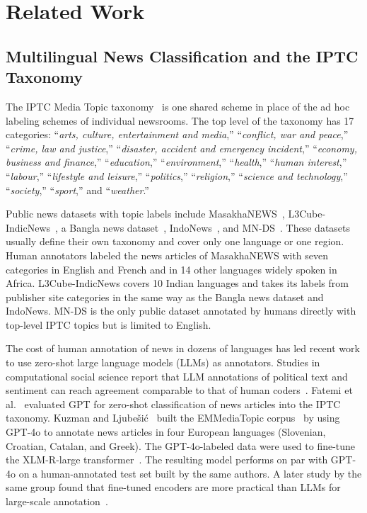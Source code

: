 \documentclass{ieeeaccess}
\begin{document}
\section{Related Work}
\label{sec:related}
\subsection{Multilingual News Classification and the IPTC Taxonomy}
\label{sec:rw-iptc}
The IPTC Media Topic taxonomy~\cite{iptc2024mediatopics} is one shared scheme in place of the ad hoc labeling schemes of individual newsrooms. The top level of the taxonomy has 17 categories: ``\emph{arts, culture, entertainment and media},'' ``\emph{conflict, war and peace},'' ``\emph{crime, law and justice},'' ``\emph{disaster, accident and emergency incident},'' ``\emph{economy, business and finance},'' ``\emph{education},'' ``\emph{environment},'' ``\emph{health},'' ``\emph{human interest},'' ``\emph{labour},'' ``\emph{lifestyle and leisure},'' ``\emph{politics},'' ``\emph{religion},'' ``\emph{science and technology},'' ``\emph{society},'' ``\emph{sport},'' and ``\emph{weather}.''

Public news datasets with topic labels include MasakhaNEWS~\cite{adelani2023masakhanews}, L3Cube-IndicNews~\cite{mirashi2023indicnews}, a Bangla news dataset~\cite{hossain2025banglanews}, IndoNews~\cite{indonews2021}, and MN-DS~\cite{petukhova2023mnds}. These datasets usually define their own taxonomy and cover only one language or one region. Human annotators labeled the news articles of MasakhaNEWS with seven categories in English and French and in 14 other languages widely spoken in Africa. L3Cube-IndicNews covers 10 Indian languages and takes its labels from publisher site categories in the same way as the Bangla news dataset and IndoNews. MN-DS is the only public dataset annotated by humans directly with top-level IPTC topics but is limited to English.

The cost of human annotation of news in dozens of languages has led recent work to use zero-shot large language models (LLMs) as annotators. Studies in computational social science report that LLM annotations of political text and sentiment can reach agreement comparable to that of human coders~\cite{heseltine2024llmannotation,bojic2025llmvshuman}. Fatemi et al.~\cite{fatemi2023gptiptc} evaluated GPT for zero-shot classification of news articles into the IPTC taxonomy. Kuzman and Ljube\v{s}i\'c~\cite{kuzman2025llm} built the EMMediaTopic corpus~\cite{emmediatopic2025} by using GPT-4o to annotate news articles in four European languages (Slovenian, Croatian, Catalan, and Greek). The GPT-4o-labeled data were used to fine-tune the XLM-R-large transformer~\cite{conneau2020xlmr}. The resulting model performs on par with GPT-4o on a human-annotated test set built by the same authors. A later study by the same group found that fine-tuned encoders are more practical than LLMs for large-scale annotation~\cite{kuzman2025southslavic}.
\end{document}

